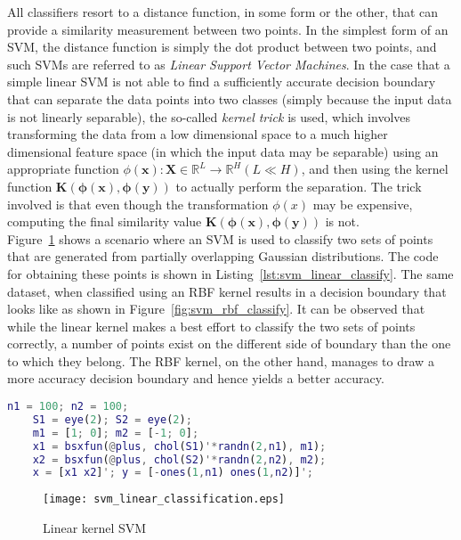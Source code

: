 All classifiers resort to a distance function, in some form or the other, that can provide a similarity measurement between two points. In the simplest form of an SVM, the distance function is simply the dot product between two points, and such SVMs are referred to as \emph{Linear Support Vector Machines}. In the case that a simple linear SVM is not able to find a sufficiently accurate decision boundary that can separate the data points into two classes (simply because the input data is not linearly separable), the so-called \emph{kernel trick} is used, which involves transforming the data from a low dimensional space to a much higher dimensional feature space (in which the input data may be separable) using an appropriate function $\phi(\mathbf{x}): \mathbf{X} \in \mathbb{R}^{L} \rightarrow \mathbb{R}^H (L \ll H)$, and then using the kernel function $\mathbf{K(\phi(x), \phi(y))}$ to actually perform the separation. The trick involved is that even though the transformation $\phi(x)$ may be expensive, computing the final similarity value $\mathbf{K(\phi(x), \phi(y))}$ is not.\\

Figure~\ref{fig:svm_linear_classify} shows a scenario where an SVM is used to classify two sets of points that are generated from partially overlapping Gaussian distributions. The code for obtaining these points is shown in Listing~\ref{lst:svm_linear_classify}. The same dataset, when classified using an RBF kernel results in a decision boundary that looks like as shown in Figure~\ref{fig:svm_rbf_classify}. It can be observed that while the linear kernel makes a best effort to classify the two sets of points correctly, a number of points exist on the different side of boundary than the one to which they belong. The RBF kernel, on the other hand, manages to draw a more accuracy decision boundary and hence yields a better accuracy.

\begin{lstlisting}[language=Matlab,frame=single,captionpos=b,caption={Generating the dataset to be classified by a linear classifier},label={lst:svm_linear_classify}]
    n1 = 100; n2 = 100;
    S1 = eye(2); S2 = eye(2);
    m1 = [1; 0]; m2 = [-1; 0];
    x1 = bsxfun(@plus, chol(S1)'*randn(2,n1), m1);
    x2 = bsxfun(@plus, chol(S2)'*randn(2,n2), m2);
    x = [x1 x2]'; y = [-ones(1,n1) ones(1,n2)]';
\end{lstlisting}

\begin{figure}
    \centering
    \texttt{[image: svm\_linear\_classification.eps]}
    \caption{Linear kernel SVM}
    \label{fig:svm_linear_classify}
\end{figure}
    
